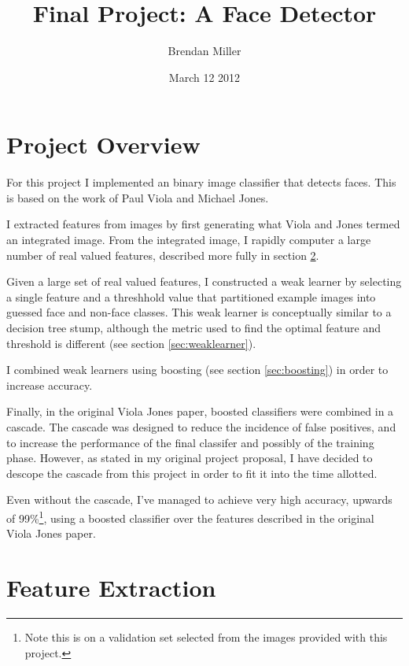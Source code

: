 \documentclass[11pt,twocolumn]{article}
\title{Final Project: A Face Detector}
\author{Brendan Miller}
\date{March 12 2012}
\begin{document}

\section{Project Overview}

For this project I implemented an binary image classifier that detects
faces. This is based on the work of Paul Viola and Michael
Jones\cite{violajones2001}.

I extracted features from images by first generating what Viola and
Jones termed an integrated image. From the integrated image, I rapidly
computer a large number of real valued features, described more fully
in section \ref{sec:features}.

Given a large set of real valued features, I constructed a weak
learner by selecting a single feature and a threshhold value that
partitioned example images into guessed face and non-face classes. This
weak learner is conceptually similar to a decision tree stump,
although the metric used to find the optimal feature and threshold is
different (see section \ref{sec:weaklearner}).

I combined weak learners using boosting (see section
\ref{sec:boosting}) in order to increase accuracy.

Finally, in the original Viola Jones paper, boosted classifiers were
combined in a cascade. The cascade was designed to reduce the
incidence of false positives, and to increase the performance of the
final classifer and possibly of the training phase. However, as stated
in my original project proposal, I have decided to descope the cascade
from this project in order to fit it into the time allotted.

Even without the cascade, I've managed to achieve very high accuracy,
upwards of 99\%\footnote{Note this is on a validation set selected
  from the images provided with this project.}, using a
boosted classifier over the features described in the original Viola
Jones paper.

\section{Feature Extraction}
\label{sec:features}
\end{document}
